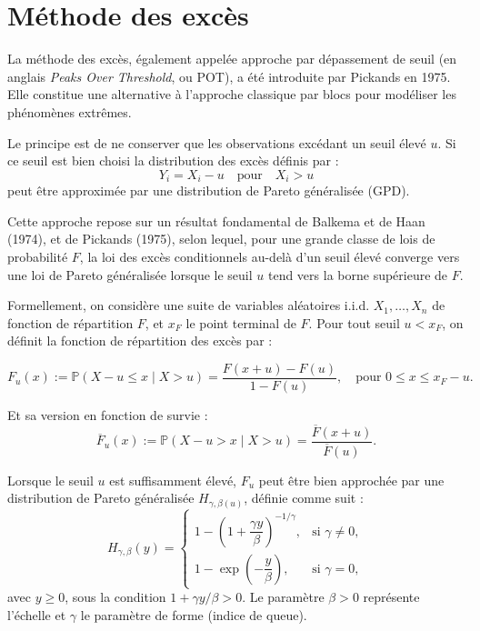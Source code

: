 \documentclass{article}
\theoremstyle{plain}
\theoremstyle{definition}
\theoremstyle{plain}
\begin{document}
\section{Méthode des excès}

La méthode des excès, également appelée approche par dépassement de seuil (en anglais \textit{Peaks Over Threshold}, ou POT), a été introduite par Pickands en 1975. Elle constitue une alternative à l’approche classique par blocs pour modéliser les phénomènes extrêmes.

Le principe est de ne conserver que les observations excédant un seuil élevé \( u \). Si ce seuil est bien choisi la distribution des excès définis par :
\[
Y_i = X_i - u \quad \text{pour} \quad X_i > u
\]
peut être approximée par une distribution de Pareto généralisée (GPD).

\medskip
Cette approche repose sur un résultat fondamental de Balkema et de Haan (1974), et de Pickands (1975), selon lequel, pour une grande classe de lois de probabilité \(F\), la loi des excès conditionnels au-delà d’un seuil élevé converge vers une loi de Pareto généralisée lorsque le seuil \(u\) tend vers la borne supérieure de \(F\).

\medskip
Formellement, on considère une suite de variables aléatoires i.i.d. \(X_1, \dots, X_n\) de fonction de répartition \(F\), et \(x_F\) le point terminal de \(F\). Pour tout seuil \(u < x_F\), on définit la fonction de répartition des excès par :

\[
F_u(x) := \mathbb{P}(X - u \leq x \mid X > u) = \frac{F(x + u) - F(u)}{1 - F(u)},
\quad \text{pour } 0 \leq x \leq x_F - u.
\]

Et sa version en fonction de survie :
\[
\overline{F}_u(x) := \mathbb{P}(X - u > x \mid X > u) = \frac{\overline{F}(x + u)}{\overline{F}(u)}.
\]

Lorsque le seuil \(u\) est suffisamment élevé, \(F_u\) peut être bien approchée par une distribution de Pareto généralisée \(H_{\gamma, \beta(u)}\), définie comme suit :
\[
H_{\gamma, \beta}(y) =
\begin{cases}
1 - \left(1 + \dfrac{\gamma y}{\beta}\right)^{-1/\gamma}, & \text{si } \gamma \neq 0, \\
1 - \exp\left(-\dfrac{y}{\beta}\right), & \text{si } \gamma = 0,
\end{cases}
\]
avec \( y \geq 0 \), sous la condition \(1 + \gamma y/\beta > 0\). Le paramètre \(\beta > 0\) représente l’échelle et \(\gamma\) le paramètre de forme (indice de queue).
\end{document}
